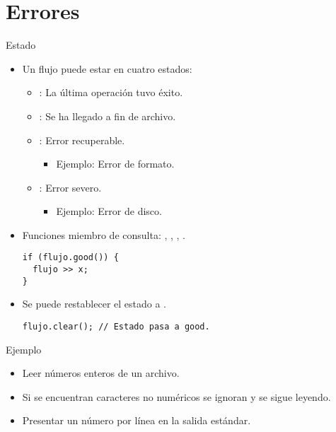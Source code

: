 \section{Errores}

\begin{frame}[t,fragile]{Estado}
\begin{itemize}
  \item Un flujo puede estar en cuatro estados:
    \begin{itemize}
      \item {}: La última operación tuvo éxito.
      \item {}: Se ha llegado a fin de archivo.
      \item {}: Error recuperable.
        \begin{itemize}
          \item Ejemplo: Error de formato.
        \end{itemize}
      \item {}: Error severo.
        \begin{itemize}
          \item Ejemplo: Error de disco.
        \end{itemize}
    \end{itemize}

  \item Funciones miembro de consulta: , , , .
\begin{lstlisting}
if (flujo.good()) {
  flujo >> x;
}
\end{lstlisting}

  \item Se puede restablecer el estado a .
\begin{lstlisting}
flujo.clear(); // Estado pasa a good.
\end{lstlisting}
\end{itemize}
\end{frame}

\begin{frame}[t]{Ejemplo}
\begin{itemize}
  \item Leer números enteros de un archivo.
  \item Si se encuentran caracteres no numéricos se ignoran y se sigue leyendo.
  \item Presentar un número por línea en la salida estándar.
\end{itemize}
\end{frame}

